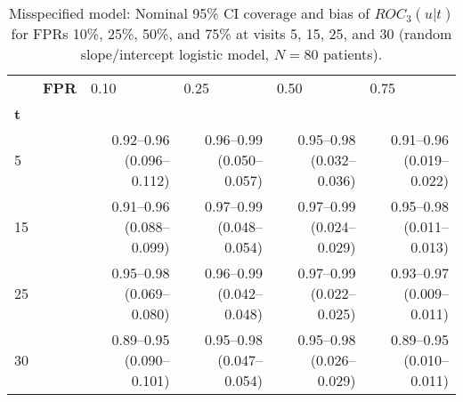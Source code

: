 \begin{table}[ht]
\centering
\begin{tabular}{ll |rrrr}
  \hline
             & \textbf{FPR} & \multicolumn{1}{l}{                      0.10} & \multicolumn{1}{l}{                      0.25} & \multicolumn{1}{l}{                      0.50} & \multicolumn{1}{l}{                      0.75} \\
  \textbf{t} &               & \multicolumn{1}{l}{                          } & \multicolumn{1}{l}{                          } & \multicolumn{1}{l}{                          } & \multicolumn{1}{l}{                          } \\
   \hline
5           &               & 0.92--0.96 (0.096--0.112) & 0.96--0.99 (0.050--0.057) & 0.95--0.98 (0.032--0.036) & 0.91--0.96 (0.019--0.022) \\
  15          &               & 0.91--0.96 (0.088--0.099) & 0.97--0.99 (0.048--0.054) & 0.97--0.99 (0.024--0.029) & 0.95--0.98 (0.011--0.013) \\
  25          &               & 0.95--0.98 (0.069--0.080) & 0.96--0.99 (0.042--0.048) & 0.97--0.99 (0.022--0.025) & 0.93--0.97 (0.009--0.011) \\
  30          &               & 0.89--0.95 (0.090--0.101) & 0.95--0.98 (0.047--0.054) & 0.95--0.98 (0.026--0.029) & 0.89--0.95 (0.010--0.011) \\
   \hline
\end{tabular}
\caption{Misspecified model: Nominal 95\% CI coverage and bias of $ROC_3(u|t)$ for FPRs 10\%, 25\%, 50\%, and 75\% at visits 5, 15, 25, and 30 (random slope/intercept logistic model, $N=80$ patients).}
\label{tab:2}
\end{table}
